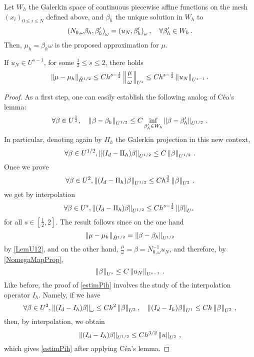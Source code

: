 \documentclass[a4paper]{article}
\begin{document}
Let $W_h$ the Galerkin space of continuous piecewise affine functions 
on the mesh $(x_i)_{0\leq i \leq N}$ defined above, and $\beta_h$ the unique solution in $W_h$ to
\begin{equation}
\label{NomegaBetaGalerk}
\left( N_{0,\omega} \beta_h,\beta_h'\right)_{\omega} = \left( u_N,\beta_h'\right)_{\omega}, \quad \forall \beta_h' \in W_h\,.
\end{equation}
Then, $\mu_h = {\beta_h}{\omega}$ is the proposed approximation for $\mu$.
\begin{theorem}
	If $u_N \in U^{s-1}$, for some $\frac{1}{2} \leq s \leq 2$, there holds 
	\[\left\|\mu - \mu_h\right\|_{\tilde{H}^{1/2}} \leq Ch^{s - \frac{1}{2}}\left\|\frac{\mu}{\omega}\right\|_{U^s} \leq C h^{s - \frac{1}{2}}\left\|u_N\right\|_{U^{s-1}}.\]
	\label{theOrdreCVNeumann}
\end{theorem}
\begin{proof}
	As a first step, one can easily establish the following analog of Céa's lemma:
	\[\forall \beta \in U^{\frac{1}{2}},\quad \left\|\beta - \beta_h\right\|_{U^{1/2}} \leq C \inf_{\beta'_h \in W_h} \left\|\beta - \beta'_h\right\|_{U^{1/2}}\,.\] 
	In particular, denoting again by $\Pi_h$ the Galerkin projection in this new context, 
	\[\forall \beta \in U^{1/2}, \left\|(I_d - \Pi_h)\beta\right\|_{U^{1/2}} \leq C \left\|\beta\right\|_{U^{1/2}}\,.\]
	Once we prove 
	\begin{equation}
		\forall \beta \in U^{2}, \left\|(I_d - \Pi_h)\beta\right\|_{U^{1/2}} \leq Ch^{\frac{3}{2}} \left\|\beta\right\|_{U^{2}}\,.
		\label{estimPih}
	\end{equation}
	we get by interpolation 
	\[\forall \beta \in U^{s}, \left\|(I_d - \Pi_h)\beta\right\|_{U^{1/2}} \leq Ch^{s - \frac{1}{2}} \left\|\beta\right\|_{U^{s}}\,\]
	for all $s \in [\frac{1}{2},2]$. The result follows since on the one hand 
	\[\left\|\mu - \mu_h\right\|_{\tilde{H}^{1/2}} = \left\|\beta - \beta_h\right\|_{U^{1/2}}\]
	by \autoref{LemU12}, and on the other hand, $\frac{\mu}{\omega} = \beta = N_{0,\omega}^{-1}u_N$, and therefore, by \autoref{NomegaMapProp}, 
	\[\left\|\beta\right\|_{U^s} \leq C \left\|u_N\right\|_{U^{s-1}}\,.\]
	Like before, the proof of \eqref{estimPih} involves the study of the interpolation operator $I_h$. Namely, if we have
	\begin{equation}
		\forall \beta \in U^2, \left\| (I_d - I_h) \beta\right\|_{\omega} \leq Ch^2\left\|\beta\right\|_{U^2}, \quad 
		\left\|(I_d -I_h) \beta\right\|_{U^1} \leq Ch \left\|\beta\right\|_{U^2}\,,
		\label{estimatesU0U1}
	\end{equation}
	then, by interpolation, we obtain 
	\[\left\|(I_d - I_h) \beta\right\|_{U^{1/2}} \leq C h^{3/2}\left\|u\right\|_{U^2}\,,\]
	which gives \eqref{estimPih} after applying Céa's lemma. 

\end{proof}
\end{document}
